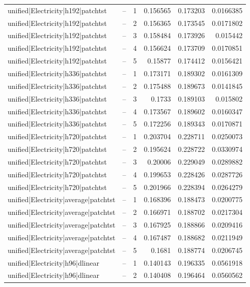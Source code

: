 \begin{longtable}{llrrrr}
unified|Electricity|h192|patchtst & -- & 1 & 0.156565 & 0.173203 & 0.0166385 \\
unified|Electricity|h192|patchtst & -- & 2 & 0.156365 & 0.173545 & 0.0171802 \\
unified|Electricity|h192|patchtst & -- & 3 & 0.158484 & 0.173926 & 0.015442 \\
unified|Electricity|h192|patchtst & -- & 4 & 0.156624 & 0.173709 & 0.0170851 \\
unified|Electricity|h192|patchtst & -- & 5 & 0.15877 & 0.174412 & 0.0156421 \\
unified|Electricity|h336|patchtst & -- & 1 & 0.173171 & 0.189302 & 0.0161309 \\
unified|Electricity|h336|patchtst & -- & 2 & 0.175488 & 0.189673 & 0.0141845 \\
unified|Electricity|h336|patchtst & -- & 3 & 0.1733 & 0.189103 & 0.015802 \\
unified|Electricity|h336|patchtst & -- & 4 & 0.173567 & 0.189602 & 0.0160347 \\
unified|Electricity|h336|patchtst & -- & 5 & 0.172256 & 0.189343 & 0.0170871 \\
unified|Electricity|h720|patchtst & -- & 1 & 0.203704 & 0.228711 & 0.0250073 \\
unified|Electricity|h720|patchtst & -- & 2 & 0.195624 & 0.228722 & 0.0330974 \\
unified|Electricity|h720|patchtst & -- & 3 & 0.20006 & 0.229049 & 0.0289882 \\
unified|Electricity|h720|patchtst & -- & 4 & 0.199653 & 0.228426 & 0.0287726 \\
unified|Electricity|h720|patchtst & -- & 5 & 0.201966 & 0.228394 & 0.0264279 \\
unified|Electricity|average|patchtst & -- & 1 & 0.168396 & 0.188473 & 0.0200775 \\
unified|Electricity|average|patchtst & -- & 2 & 0.166971 & 0.188702 & 0.0217304 \\
unified|Electricity|average|patchtst & -- & 3 & 0.167925 & 0.188866 & 0.0209416 \\
unified|Electricity|average|patchtst & -- & 4 & 0.167487 & 0.188682 & 0.0211949 \\
unified|Electricity|average|patchtst & -- & 5 & 0.1681 & 0.188774 & 0.0206745 \\
unified|Electricity|h96|dlinear & -- & 1 & 0.140143 & 0.196335 & 0.0561918 \\
unified|Electricity|h96|dlinear & -- & 2 & 0.140408 & 0.196464 & 0.0560562 \\

\end{longtable}
